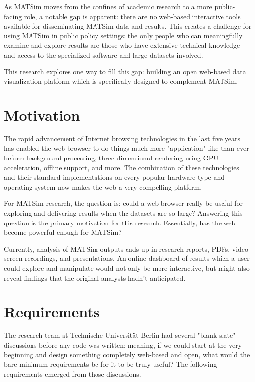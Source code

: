 \documentclass[Afour,sagev,times]{sagej}
\begin{document}
As MATSim moves from the confines of academic research to a more
public-facing role, a notable gap is apparent: there are no web-based interactive tools available for disseminating MATSim data and results. This creates a challenge for using MATSim in public policy settings: the only people who can meaningfully examine and explore results are those who have extensive technical knowledge and access to the specialized software and large datasets involved.

This research explores one way to fill this gap: building an open
web-based data visualization platform which is specifically designed
to complement MATSim.

\section{Motivation}

The rapid advancement of Internet browsing technologies in the last
five years has enabled the web browser to do things much more
"application"-like than ever before: background processing,
three-dimensional rendering using GPU acceleration, offline
support, and more. The combination of these technologies and their
standard implementations on every popular hardware type and operating system now makes the web a very compelling platform.

For MATSim research, the question is: could a web browser really
be useful for exploring and delivering results when the datasets
are so large? Answering this question is the primary motivation for
this research. Essentially, has the web become powerful enough for MATSim?

Currently, analysis of MATSim outputs ends up in research reports, PDFs, video screen-recordings, and presentations. An online dashboard of results which a user could explore and manipulate would not only be more interactive, but might also reveal findings that the original analysts hadn't anticipated.

\section{Requirements}
The research team at Technische Universit\"at Berlin had several
"blank slate" discussions before any code was written: meaning,
if we could start at the very beginning and design something completely web-based and open, what would the bare minimum requirements be for it to be truly useful? The following requirements emerged from those discussions.
\end{document}
